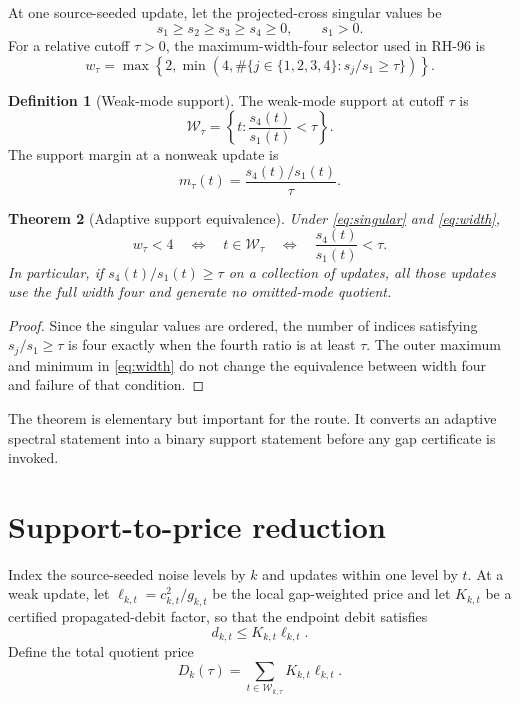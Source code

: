 \documentclass[11pt]{article}
\newtheorem{theorem}{Theorem}[section]
\theoremstyle{definition}
\newtheorem{definition}[theorem]{Definition}
\theoremstyle{remark}
\begin{document}
At one source-seeded update, let the projected-cross singular values be
\begin{equation}
 s_1\ge s_2\ge s_3\ge s_4\ge0,
 \qquad s_1>0.
 \label{eq:singular}
\end{equation}
For a relative cutoff $\tau>0$, the maximum-width-four selector used in
RH-96 is
\begin{equation}
 w_\tau=\max\!\left\{2,\min\!\left(4,
 \#\{j\in\{1,2,3,4\}:s_j/s_1\ge\tau\}\right)\right\}.
 \label{eq:width}
\end{equation}

\begin{definition}[Weak-mode support]
 The weak-mode support at cutoff $\tau$ is
 \[
 \mathcal W_\tau=\left\{t:\frac{s_4(t)}{s_1(t)}<\tau\right\}.
 \]
 The support margin at a nonweak update is
 \[
 m_\tau(t)=\frac{s_4(t)/s_1(t)}{\tau}.
 \]
\end{definition}

\begin{theorem}[Adaptive support equivalence]
 \label{thm:equivalence}
 Under \eqref{eq:singular} and \eqref{eq:width},
 \begin{equation}
 w_\tau<4
 \quad\Longleftrightarrow\quad
 t\in\mathcal W_\tau
 \quad\Longleftrightarrow\quad
 \frac{s_4(t)}{s_1(t)}<\tau.
 \label{eq:equivalence}
 \end{equation}
 In particular, if $s_4(t)/s_1(t)\ge\tau$ on a collection of updates, all
 those updates use the full width four and generate no omitted-mode quotient.
\end{theorem}

\begin{proof}
 Since the singular values are ordered, the number of indices satisfying
 $s_j/s_1\ge\tau$ is four exactly when the fourth ratio is at least $\tau$.
 The outer maximum and minimum in \eqref{eq:width} do not change the
 equivalence between width four and failure of that condition.
\end{proof}

The theorem is elementary but important for the route.  It converts an
adaptive spectral statement into a binary support statement before any gap
certificate is invoked.

\section{Support-to-price reduction}
\label{sec:reduction}

Index the source-seeded noise levels by $k$ and updates within one level by
$t$.  At a weak update, let $\ell_{k,t}=c_{k,t}^2/g_{k,t}$ be the local
gap-weighted price and let $K_{k,t}$ be a certified propagated-debit factor,
so that the endpoint debit satisfies
\begin{equation}
 d_{k,t}\le K_{k,t}\ell_{k,t}.
 \label{eq:debit}
\end{equation}
Define the total quotient price
\begin{equation}
 D_k(\tau)=\sum_{t\in\mathcal W_{k,\tau}}K_{k,t}\ell_{k,t}.
 \label{eq:total-price}
\end{equation}
\end{document}
